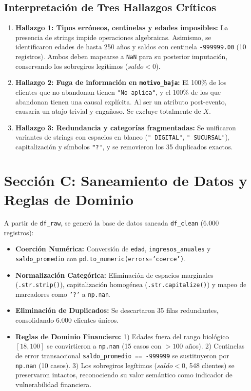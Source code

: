 \documentclass[12pt,a4paper]{article}
\begin{document}
\subsection{Interpretación de Tres Hallazgos Críticos}
\begin{enumerate}
    \item \textbf{Hallazgo 1: Tipos erróneos, centinelas y edades imposibles:} La presencia de strings impide operaciones algebraicas. Asimismo, se identificaron edades de hasta 250 años y saldos con centinela \texttt{-999999.00} (10 registros). Ambos deben mapearse a \texttt{NaN} para su posterior imputación, conservando los sobregiros legítimos ($saldo < 0$).
    \item \textbf{Hallazgo 2: Fuga de información en \texttt{motivo\_baja}:} El 100\% de los clientes que no abandonan tienen \texttt{"No aplica"}, y el 100\% de los que abandonan tienen una causal explícita. Al ser un atributo post-evento, causaría un atajo trivial y engañoso. Se excluye totalmente de $X$.
    \item \textbf{Hallazgo 3: Redundancia y categorías fragmentadas:} Se unificaron variantes de strings con espacios en blanco (\texttt{" DIGITAL"}, \texttt{" SUCURSAL"}), capitalización y símbolos \texttt{"?"}, y se removieron los 35 duplicados exactos.
\end{enumerate}

\section{Sección C: Saneamiento de Datos y Reglas de Dominio}

A partir de \texttt{df\_raw}, se generó la base de datos saneada \texttt{df\_clean} (6.000 registros):
\begin{itemize}[noitemsep]
    \item \textbf{Coerción Numérica:} Conversión de \texttt{edad}, \texttt{ingresos\_anuales} y \texttt{saldo\_promedio} con \texttt{pd.to\_numeric(errors='coerce')}.
    \item \textbf{Normalización Categórica:} Eliminación de espacios marginales (\texttt{.str.strip()}), capitalización homogénea (\texttt{.str.capitalize()}) y mapeo de marcadores como \texttt{'?'} a \texttt{np.nan}.
    \item \textbf{Eliminación de Duplicados:} Se descartaron 35 filas redundantes, consolidando 6.000 clientes únicos.
    \item \textbf{Reglas de Dominio Financiero:} 
    1) Edades fuera del rango biológico $[18, 100]$ se convirtieron a \texttt{np.nan} (15 casos con $>100$ años).
    2) Centinelas de error transaccional \texttt{saldo\_promedio == -999999} se sustituyeron por \texttt{np.nan} (10 casos).
    3) Los sobregiros legítimos ($saldo < 0$, 548 clientes) se preservaron intactos, reconociendo su valor semántico como indicador de vulnerabilidad financiera.
\end{itemize}
\end{document}
